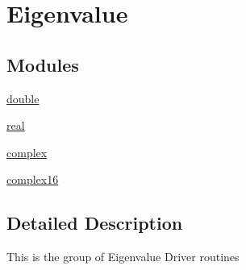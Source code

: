 \hypertarget{group__eigenGE}{}\section{Eigenvalue}
\label{group__eigenGE}
\subsection*{Modules}
\begin{DoxyCompactItemize}
\item 
\hyperlink{group__doubleGEeigen}{double}
\item 
\hyperlink{group__realGEeigen}{real}
\item 
\hyperlink{group__complexGEeigen}{complex}
\item 
\hyperlink{group__complex16GEeigen}{complex16}
\end{DoxyCompactItemize}


\subsection{Detailed Description}
This is the group of Eigenvalue Driver routines 